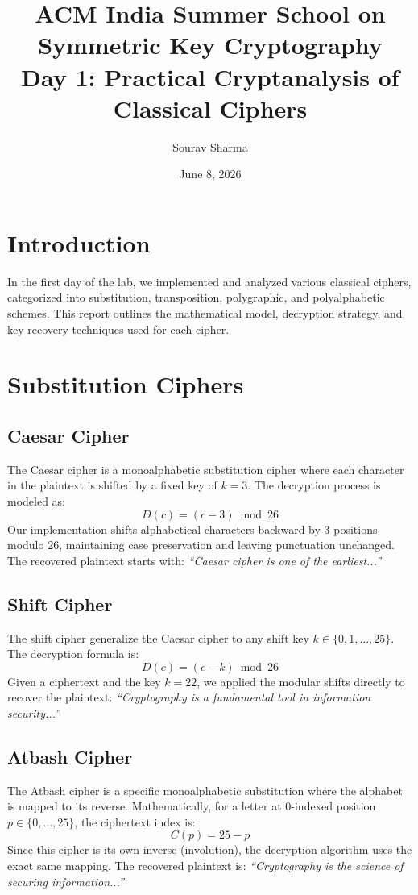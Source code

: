 \documentclass{article}
\title{ACM India Summer School on Symmetric Key Cryptography \\ Day 1: Practical Cryptanalysis of Classical Ciphers}
\author{Sourav Sharma}
\date{June 8, 2026}
\begin{document}
\maketitle

\section{Introduction}
In the first day of the lab, we implemented and analyzed various classical ciphers, categorized into substitution, transposition, polygraphic, and polyalphabetic schemes. This report outlines the mathematical model, decryption strategy, and key recovery techniques used for each cipher.

\section{Substitution Ciphers}

\subsection{Caesar Cipher}
The Caesar cipher is a monoalphabetic substitution cipher where each character in the plaintext is shifted by a fixed key of $k = 3$. 
The decryption process is modeled as:
\[ D(c) = (c - 3) \bmod 26 \]
Our implementation shifts alphabetical characters backward by 3 positions modulo 26, maintaining case preservation and leaving punctuation unchanged. The recovered plaintext starts with: \textit{``Caesar cipher is one of the earliest...''}

\subsection{Shift Cipher}
The shift cipher generalize the Caesar cipher to any shift key $k \in \{0, 1, \dots, 25\}$. The decryption formula is:
\[ D(c) = (c - k) \bmod 26 \]
Given a ciphertext and the key $k = 22$, we applied the modular shifts directly to recover the plaintext: \textit{``Cryptography is a fundamental tool in information security...''}

\subsection{Atbash Cipher}
The Atbash cipher is a specific monoalphabetic substitution where the alphabet is mapped to its reverse. Mathematically, for a letter at 0-indexed position $p \in \{0, \dots, 25\}$, the ciphertext index is:
\[ C(p) = 25 - p \]
Since this cipher is its own inverse (involution), the decryption algorithm uses the exact same mapping. The recovered plaintext is: \textit{``Cryptography is the science of securing information...''}
\end{document}
